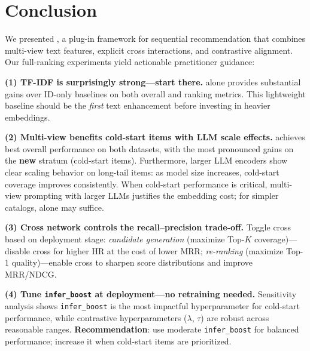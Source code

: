 \section{Conclusion}
We presented \model, a plug-in framework for sequential recommendation that
combines multi-view text features, explicit cross interactions, and contrastive
alignment. Our full-ranking experiments yield actionable practitioner guidance:

\textbf{(1) TF-IDF is surprisingly strong---start there.}
\tfidf alone provides substantial gains over ID-only baselines on both
overall and ranking metrics. This lightweight baseline should be the
\emph{first} text enhancement before investing in heavier \llm embeddings.

\textbf{(2) Multi-view benefits cold-start items with LLM scale effects.}
\model achieves best overall performance on both datasets, with the most
pronounced gains on the \textbf{new} stratum (cold-start items). Furthermore,
larger LLM encoders show clear scaling behavior on long-tail items: as model
size increases, cold-start coverage improves consistently. When cold-start
performance is critical, multi-view prompting with larger LLMs justifies
the embedding cost; for simpler catalogs, \tfidf alone may suffice.

\textbf{(3) Cross network controls the recall--precision trade-off.}
Toggle cross based on deployment stage:
\emph{candidate generation} (maximize Top-$K$ coverage)---disable cross for
higher HR at the cost of lower MRR;
\emph{re-ranking} (maximize Top-1 quality)---enable cross to sharpen score
distributions and improve MRR/NDCG.

\textbf{(4) Tune \texttt{infer\_boost} at deployment---no retraining needed.}
Sensitivity analysis shows \texttt{infer\_boost} is the most impactful
hyperparameter for cold-start performance, while contrastive hyperparameters
($\lambda$, $\tau$) are robust across reasonable ranges.
\textbf{Recommendation}: use moderate \texttt{infer\_boost} for balanced
performance; increase it when cold-start items are prioritized.




\clearpage  %

\appendix
